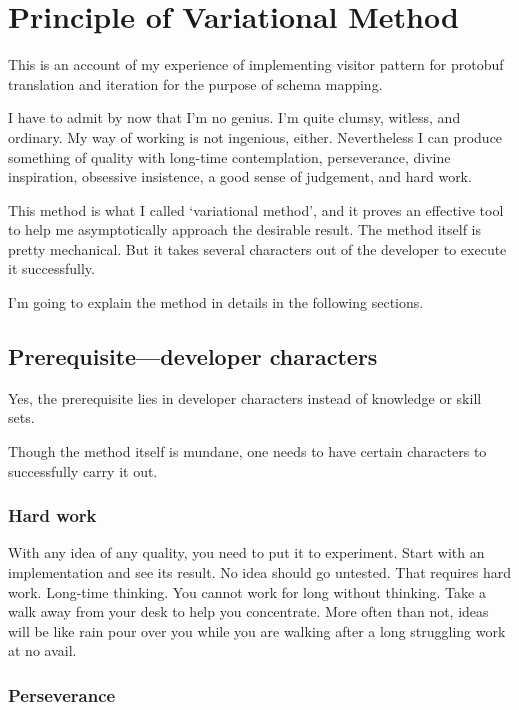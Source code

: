 \section{Principle of Variational Method}\label{sec:principleOfVariationalMethod}

This is an account of my experience of implementing visitor pattern for protobuf translation and
iteration for the purpose of schema mapping.

I have to admit by now that I'm no genius.
I'm quite clumsy, witless, and ordinary.
My way of working is not ingenious, either.
Nevertheless I can produce something of quality with long-time contemplation,
perseverance, divine inspiration, obsessive insistence, a good sense of judgement, and hard work.

This method is what I called `variational method', and it proves an effective tool to help
me asymptotically approach the desirable result.
The method itself is pretty mechanical.
But it takes several characters out of the developer to execute it successfully.

I'm going to explain the method in details in the following sections.

\subsection{Prerequisite---developer characters}\label{subsec:prerequisiteDeveloperCharacters}

Yes, the prerequisite lies in developer characters instead of knowledge or skill sets.

Though the method itself is mundane, one needs to have certain
characters to successfully carry it out.

\subsubsection{Hard work}

With any idea of any quality, you need to put it to experiment.
Start with an implementation and see its result.
No idea should go untested.
That requires hard work.
Long-time thinking.
You cannot work for long without thinking.
Take a walk away from your desk to help you concentrate.
More often than not, ideas will be like rain pour over you while you are walking after a long
struggling work at no avail.

\subsubsection{Perseverance}

